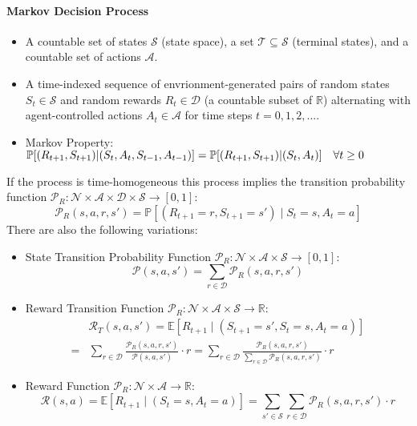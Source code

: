 \documentclass[11pt]{article}
\begin{document}
\maketitle
\thispagestyle{first}
\paragraph{Markov Decision Process}
\begin{itemize}
    \item A countable set of states $\mathcal{S}$ (state space), a set $\mathcal{T} \subseteq \mathcal{S}$ (terminal states), and a countable set of actions $\mathcal{A}$.
    \item A time-indexed sequence of envrionment-generated pairs of random states $S_t\in\mathcal{S}$ and random rewards $R_t \in\mathcal{D}$ (a countable subset of $\mathbb{R}$) alternating with agent-controlled actions $A_t \in\mathcal{A}$ for time steps $t = 0, 1, 2, ...$. 
    \item Markov Property: $\P{(R_{t+1}, S_{t+1})|(S_t, A_t, S_{t-1}, A_{t-1})} = \P{(R_{t+1}, S_{t+1})| (S_t, A_t)}\quad \forall t\geq0$
\end{itemize}

If the process is time-homogeneous this process implies the transition probability function $\mathcal{P}_R: \mathcal{N}\times\mathcal{A}\times\mathcal{D}\times\mathcal{S}\rightarrow[0, 1]$:
$$
\mathcal{P}_R\left(s, a, r, s'\right)=\mathbb{P}\left[\left(R_{t+1}=r, S_{t+1}=s'\right) \mid S_t=s, A_t=a\right]
$$
There are also the following variations:
\begin{itemize}
    \item State Transition Probability Function $\mathcal{P}_R: \mathcal{N}\times\mathcal{A}\times\mathcal{S}\rightarrow[0, 1]$:
        $$
        \mathcal{P}\left(s, a, s'\right)=\sum_{r \in \mathcal{D}} \mathcal{P}_R\left(s, a, r, s'\right)
        $$
    \item Reward Transition Function $\mathcal{P}_R: \mathcal{N}\times\mathcal{A}\times\mathcal{S}\rightarrow\mathbb{R}$:
        $$
        \begin{aligned}
        & \mathcal{R}_T\left(s, a, s'\right)=\mathbb{E}\left[R_{t+1} \mid\left(S_{t+1}=s', S_t=s, A_t=a\right)\right] \\
        = & \sum_{r \in \mathcal{D}} \frac{\mathcal{P}_R\left(s, a, r, s'\right)}{\mathcal{P}\left(s, a, s'\right)} \cdot r=\sum_{r \in \mathcal{D}} \frac{\mathcal{P}_R\left(s, a, r, s'\right)}{\sum_{r \in \mathcal{D}} \mathcal{P}_R\left(s, a, r, s'\right)} \cdot r
        \end{aligned}
        $$
    \item Reward Function $\mathcal{P}_R: \mathcal{N}\times\mathcal{A}\rightarrow\mathbb{R}$:
        $$
        \mathcal{R}(s, a)=\mathbb{E}\left[R_{t+1} \mid\left(S_t=s, A_t=a\right)\right]=\sum_{s' \in \mathcal{S}} \sum_{r \in \mathcal{D}} \mathcal{P}_R\left(s, a, r, s'\right) \cdot r
        $$
\end{itemize}
\end{document}
